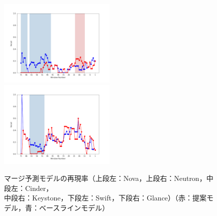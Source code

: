 \documentclass[11pt]{jreport}
\begin{document}
\begin{figure}[H]
\begin{minipage}{\textwidth}
\begin{center}
    \includegraphics[width=0.495\textwidth]{Uenaka_fig/RQ2_result/Swift_merge_Recall.pdf}
    \includegraphics[width=0.495\textwidth]{Uenaka_fig/RQ2_result/Glance_merge_Recall.pdf}
    \caption{マージ予測モデルの再現率（上段左：Nova，上段右：Neutron，中段左：Cinder，\\ 中段右：Keystone，下段左：Swift，下段右：Glance）（赤：提案モデル，青：ベースラインモデル）}
    \label{fig:merge_r}
\end{center}
\vspace{0.08\textheight}
\end{minipage}
\end{figure}
\end{document}
